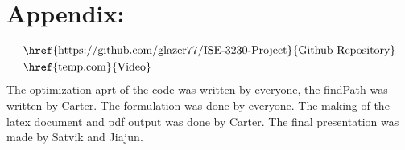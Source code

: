 \documentclass[12pt]{extarticle}
\begin{document}
\newpage
\section*{\small Appendix:}
\begin{align*}
&\text{\href{https://github.com/glazer77/ISE-3230-Project}{Github Repository}} \\
&\text{\href{temp.com}{Video}} \\
\end{align*}
The optimization aprt of the code was written by everyone, the findPath was written by Carter. The formulation was done by everyone. The making of the latex document and pdf output was done by Carter. The final presentation was made by Satvik and Jiajun.
\end{document}
